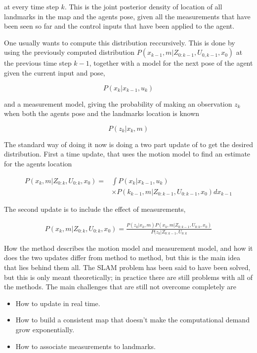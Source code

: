 at every time step $k$. This is the joint posterior density of location of all landmarks in the map and the agents pose, given all the measurements that have been seen so far and the control inputs that have been applied to the agent. 

One usually wants to compute this distribution reccursively. This is done by using the previously computed distribution $P(x_{k-1},m|Z_{0:k-1},U_{0,k-1},x_0)$ at the previous time step $k-1$, together with a model for the next pose of the agent given the current input and pose, 

\begin{equation}
    P(x_k|x_{k-1},u_k)
\end{equation}

and a measurement model, giving the probability of making an observation $z_k$ when both the agents pose and the landmarks location is known

\begin{equation}
    P(z_k|x_k,m)
\end{equation}

The standard way of doing it now is doing a two part update of to get the desired distribution. First a time update, that uses the motion model to find an estimate for the agents location


\begin{align}
    P(x_k,m|Z_{0:k},U_{0:k}, x_0) 
     = & \int P(x_k|x_{k-1},u_k) \\
    & \times P(k_{k-1},m|Z_{0:k-1},U_{0:k-1},x_0)dx_{k-1}
\end{align}

The second update is to include the effect of measurements, 

\begin{equation}
\begin{split}
    P(x_k,m|Z_{0:k},U_{0:k},x_0) 
    = \frac{P(z_k|x_k,m)P(x_k,m|Z_{0:k-1},U_{0:k},x_0)}{P(z_k|Z_{0:k-1},U_{0:k}}
\end{split}
\end{equation}

How the method describes the motion model and measurement model, and how it does the two updates differ from method to method, but this is the main idea that lies behind them all. The SLAM problem has been said to have been solved, but this is only meant theoretically; in practice there are still problems with all of the methods. The main challenges that are still not overcome completely are 

\begin{itemize}
    \item How to update in real time.
    \item How to build a consistent map that doesn't make the computational demand grow exponentially.
    \item How to associate measurements to landmarks.
\end{itemize}


